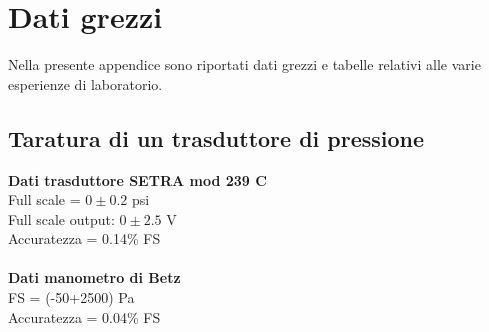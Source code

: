 \appendix
\section{Dati grezzi} 
Nella presente appendice sono riportati dati grezzi e tabelle relativi alle varie esperienze di laboratorio.

\subsection{Taratura di un trasduttore di pressione}\label{a1}
\textbf{Dati trasduttore SETRA mod 239 C}\\
Full scale = $0\pm0.2$ psi\\
Full scale output: $0\pm2.5$ V\\
Accuratezza = 0.14\% FS\\\\
\textbf{Dati manometro di Betz}\\
FS = (-50+2500) Pa\\
Accuratezza = 0.04\% FS\\

